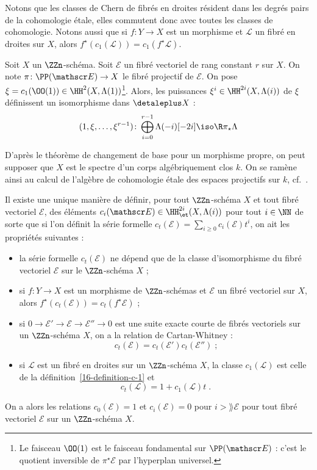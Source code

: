 \documentclass[10pt]{../fichiers-configuration-latex/smfart}
\begin{document}
Notons que les classes de Chern de fibrés en droites résident dans les degrés
pairs de la cohomologie étale, elles commutent donc avec toutes les classes
de cohomologie. Notons
aussi que si $f\colon Y\to X$ est un morphisme et 
$\mathscr L$ un fibré en droites
sur $X$, alors $f^\star(c_1(\mathscr L))=c_1(f^\star \mathscr L)$.

\begin{theoreme}%
\label{16-theoreme-formule-du-fibre-projectif}
Soit $X$ un $\ZZn$-schéma. Soit $\mathscr E$ un fibré 
vectoriel de rang constant $r$
sur $X$.
On note $\pi\colon\PP(\mathscr E)\to X$
le fibré projectif de $\mathscr E$.
On pose $\xi=c_1(\OO(1))\in \HH^2(X,\Lambda(1))$\;\footnote{Le faisceau 
$\OO(1)$ est le faisceau fondamental sur $\PP(\mathscr E)$ : c'est le 
quotient inversible de $\pi^\star \mathscr E$ par 
l'hyperplan universel.}.
Alors, les puissances $\xi^i\in \HH^{2i}(X,\Lambda(i))$ de $\xi$
définissent un isomorphisme dans $\detaleplus X$ :
\[(1,\xi,\dots,\xi^{r-1})\colon
\bigoplus_{i=0}^{r-1} \Lambda(-i)[-2i]
\iso \R\pi_\star \Lambda\]
\end{theoreme}

D'après le théorème de changement de base pour un morphisme propre, on peut
supposer que $X$ est le spectre d'un corps algébriquement clos $k$. On se
ramène ainsi au calcul de l'algèbre de cohomologie étale des espaces
projectifs sur $k$, cf.~.

\begin{theoreme}\label{16-theoreme-classes-de-chern}
Il existe une unique manière de définir, pour tout $\ZZn$-schéma $X$ et
tout fibré vectoriel $\mathscr E$, 
des éléments $c_i(\mathscr E)\in \HH^{2i}_\et(X,\Lambda(i))$
pour tout $i\in\NN$ de sorte que si l'on définit la série formelle
$c_t(\mathscr E)=\sum_{i\geq 0} c_i(\mathscr E)t^i$,
on ait les propriétés suivantes :
\begin{itemize}
\item la série formelle $c_t(\mathscr E)$ ne dépend que 
de la classe d'isomorphisme
du fibré vectoriel $\mathscr E$ sur le $\ZZn$-schéma $X$ ;
\item si $f\colon Y\to X$ est un morphisme de $\ZZn$-schémas
et $\mathscr E$ un fibré vectoriel sur
$X$, alors $f^\star(c_t(\mathscr E))=c_t(f^\star \mathscr E)$ ;
\item si $0\to \mathscr E'\to \mathscr E\to \mathscr E''\to 0$ est une
suite exacte courte de fibrés vectoriels sur un $\ZZn$-schéma $X$, on a la
relation de Cartan-Whitney :
\[c_t(\mathscr E)=c_t(\mathscr E')c_t(\mathscr E'')\;\text{;}\]
\item si $\mathscr L$ est un fibré en droites 
sur un $\ZZn$-schéma $X$, la classe
$c_1(\mathscr L)$ est celle de la définition~\ref{16-definition-c-1} et 
\[c_t(\mathscr L)=1+c_1(\mathscr L)t\;\text{.}\]
\end{itemize}

On a alors les relations $c_0(\mathscr E)=1$ et 
$c_i(\mathscr E)=0$ pour $i>\rang \mathscr E$ pour tout
fibré vectoriel $\mathscr E$ sur un $\ZZn$-schéma $X$.
\end{theoreme}
\end{document}
